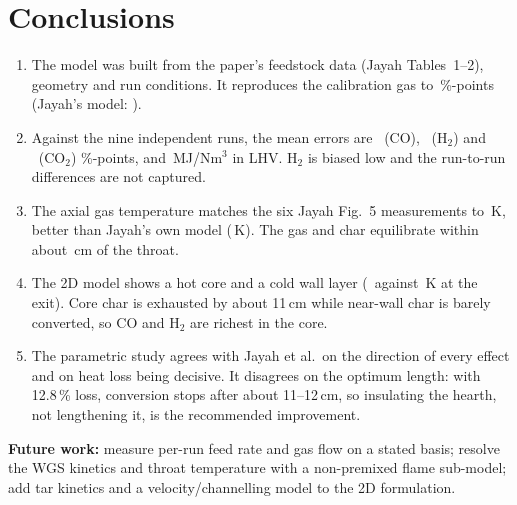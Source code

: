 \documentclass[11pt,a4paper]{article}
\begin{document}
\section{Conclusions}
\begin{enumerate}
\item The model was built from the paper's feedstock data (Jayah Tables~1--2), geometry and run conditions. It reproduces the calibration gas to \RCalMAE\,\%-points (Jayah's model: \RCalMAEJ).
\item Against the nine independent runs, the mean errors are \RMAECO\ (CO), \RMAEHtwo\ (H$_2$) and \RMAECOtwo\ (CO$_2$) \%-points, and \RMAELHV\,MJ/Nm$^3$ in LHV. H$_2$ is biased low and the run-to-run differences are not captured.
\item The axial gas temperature matches the six Jayah Fig.~5 measurements to \RTempMAE\,K, better than Jayah's own model (\RTempMAEJ\,K). The gas and char equilibrate within about \RzEquil\,cm of the throat.
\item The 2D model shows a hot core and a cold wall layer (\RTwoDaxisTexit\ against \RTwoDwallTexit\,K at the exit). Core char is exhausted by about 11\,cm while near-wall char is barely converted, so CO and H$_2$ are richest in the core.
\item The parametric study agrees with Jayah et al.\ on the direction of every effect and on heat loss being decisive. It disagrees on the optimum length: with 12.8\,\% loss, conversion stops after about 11--12\,cm, so insulating the hearth, not lengthening it, is the recommended improvement.
\end{enumerate}
\textbf{Future work:} measure per-run feed rate and gas flow on a stated basis; resolve the WGS kinetics and throat temperature with a non-premixed flame sub-model; add tar kinetics and a velocity/channelling model to the 2D formulation.

\end{document}
